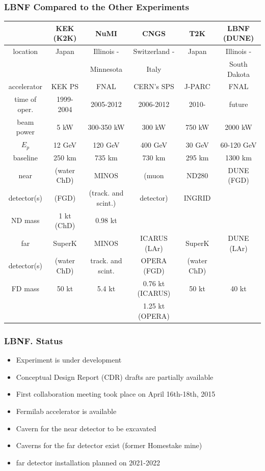 \begin{frame}\frametitle{LBNF Compared to the Other Experiments}
\tiny
  \begin{tabular}{|c|c|c|c|c|c|}
              & KEK (K2K) & NuMI & CNGS & T2K & LBNF (DUNE)\\ \hline
     location & Japan  & Illinois - & Switzerland - & Japan & Illinois - \\ 
              &        & Minnesota & Italy &  & South Dakota\\ \hline
     accelerator & KEK PS  & FNAL & CERN's SPS & J-PARC & FNAL\\ \hline
     time of oper. & 1999-2004  & 2005-2012 & 2006-2012 & 2010- & future \\ \hline 
     beam power  &  5 kW  & 300-350 kW  & 300 kW & 750 kW & 2000 kW\\ \hline 
     $E_p$  & 12 GeV & 120 GeV & 400 GeV & 30 GeV & 60-120 GeV\\ \hline 
     baseline  & 250 km & 735 km & 730 km & 295 km & 1300 km\\ \hline 
     near        & (water ChD) & MINOS               & (muon               & ND280       & DUNE (FGD)\\  
     detector(s) & (FGD)       & (track. and scint.) & detector)           & INGRID      & \\ \hline 
     ND mass     & 1 kt (ChD)  & 0.98 kt             &                     &             & \\ \hline 
     far         & SuperK      & MINOS               & ICARUS (LAr)        & SuperK      & DUNE (LAr)\\  
     detector(s) & (water ChD) & track. and scint.   & OPERA (FGD)        & (water ChD) & \\ \hline 
     FD mass     & 50 kt       & 5.4 kt              & 0.76 kt (ICARUS)   & 50 kt       & 40 kt\\ 
                 &             &                     & 1.25 kt (OPERA)    &             & \\ \hline 
 \end{tabular}
\end{frame}

\begin{frame}\frametitle{LBNF. Status}
\scriptsize
\begin{itemize}
  \item Experiment is under development
  \item Conceptual Design Report (CDR) drafts are partially available
  \item First collaboration meeting took place on April 16th-18th, 2015
  \item Fermilab accelerator is available 
  \item Cavern for the near detector to be excavated
  \item Caverns for the far detector exist (former Homestake mine)
  \item far detector installation planned on 2021-2022
\end{itemize}
\end{frame}
